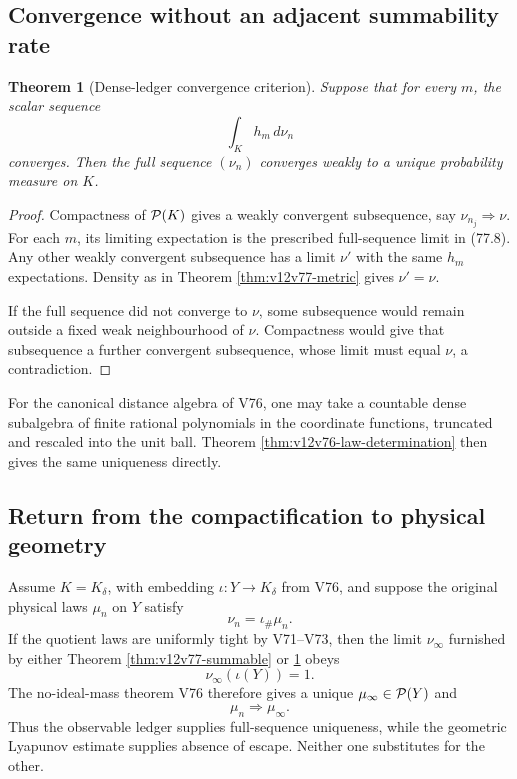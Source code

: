 \documentclass[11pt]{article}
\newtheorem{theorem}{Theorem}[section]
\theoremstyle{remark}
\begin{document}
\subsection{Convergence without an adjacent summability rate}

\begin{theorem}[Dense-ledger convergence criterion]
\label{thm:v12v77-dense}
Suppose that for every \(m\), the scalar sequence
\[
                              \int_Kh_m\,d\nu_n              \tag{77.8}
\]
converges.  Then the full sequence \((\nu_n)\) converges weakly to a
unique probability measure on \(K\).
\end{theorem}

\begin{proof}
Compactness of \({\cal P}(K)\) gives a weakly convergent subsequence,
say \(\nu_{n_j}\Rightarrow\nu\).  For each \(m\), its limiting
expectation is the prescribed full-sequence limit in (77.8).
Any other weakly convergent subsequence has a limit \(\nu'\) with the
same \(h_m\) expectations.  Density as in Theorem
\ref{thm:v12v77-metric} gives \(\nu'=\nu\).

If the full sequence did not converge to \(\nu\), some subsequence
would remain outside a fixed weak neighbourhood of \(\nu\).
Compactness would give that subsequence a further convergent
subsequence, whose limit must equal \(\nu\), a contradiction.
\end{proof}

For the canonical distance algebra of V76, one may take a countable
dense subalgebra of finite rational polynomials in the coordinate
functions, truncated and rescaled into the unit ball.  Theorem
\ref{thm:v12v76-law-determination} then gives the same uniqueness
directly.

\subsection{Return from the compactification to physical geometry}

Assume \(K=K_\delta\), with embedding
\(\iota:Y\to K_\delta\) from V76, and suppose the original physical
laws \(\mu_n\) on \(Y\) satisfy
\[
                              \nu_n=\iota_\#\mu_n.            \tag{77.9}
\]
If the quotient laws are uniformly tight by V71--V73, then the limit
\(\nu_\infty\) furnished by either Theorem
\ref{thm:v12v77-summable} or
\ref{thm:v12v77-dense} obeys
\[
                              \nu_\infty(\iota(Y))=1.         \tag{77.10}
\]
The no-ideal-mass theorem V76 therefore gives a unique
\(\mu_\infty\in{\cal P}(Y)\) and
\[
                              \mu_n\Rightarrow\mu_\infty.    \tag{77.11}
\]
Thus the observable ledger supplies full-sequence uniqueness, while
the geometric Lyapunov estimate supplies absence of escape.  Neither
one substitutes for the other.
\end{document}
